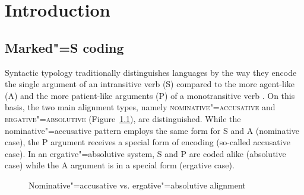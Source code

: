 \chapter{Introduction}\label{introduction}


\section{Marked"=S coding}\label{coding}

Syntactic typology traditionally distinguishes languages by the way they encode the single argument of an intransitive verb (S) compared to the more agent-like (A) and the more patient-like arguments (P) of a monotransitive verb \citep{Comrie:1978,Dixon:1979,Dixon:2010-1}. 
On this basis, the two main alignment types, namely \textsc{nominative"=accusative} and \textsc{ergative"=absolutive} (Figure~\ref{Alignment}), are dis\-tin\-guish\-ed. 
While  the nominative"=accusative pattern employs the same form for S and A (nominative case), the P argument receives a special form of encoding (so-called accusative case).  
In an ergative"=absolutive system,  S and P are coded alike (absolutive case) while the A argument is in a special form (ergative case).

\begin{figure}[ht] \centering {}

\caption{Nominative"=accusative vs. ergative"=absolutive alignment}\label{Alignment} \end{figure} 

